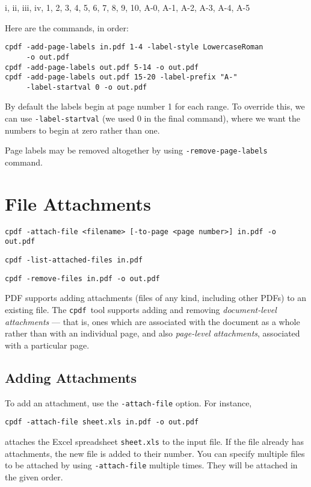 \documentclass{book}
\newcommand{\cpdf}{\texttt{cpdf}}
\begin{document}
\vspace{4mm}
i, ii, iii, iv, 1, 2, 3, 4, 5, 6, 7, 8, 9, 10, A-0, A-1, A-2, A-3, A-4, A-5
\vspace{4mm}

\noindent Here are the commands, in order:

{\small\begin{framed}
  \noindent\verb!cpdf -add-page-labels in.pdf 1-4 -label-style LowercaseRoman!\\
  \noindent\verb!     -o out.pdf!\\
  
  \noindent\verb!cpdf -add-page-labels out.pdf 5-14 -o out.pdf!\\

  \noindent\verb!cpdf -add-page-labels out.pdf 15-20 -label-prefix "A-"!\\
  \noindent\verb!     -label-startval 0 -o out.pdf!
\end{framed}}

\noindent By default the labels begin at page number 1 for each range. To override this, we can use \texttt{-label-startval} (we used $0$ in the final command), where we want the numbers to begin at zero rather than one.

Page labels may be removed altogether by using \texttt{-remove-page-labels} command.

\chapter{File Attachments}
\begin{framed}
  \small\noindent\verb!cpdf -attach-file <filename> [-to-page <page number>] in.pdf -o out.pdf!

  \vspace{1.5mm}
  \small\noindent\verb!cpdf -list-attached-files in.pdf!
 
  \vspace{1.5mm}
  \small\noindent\verb!cpdf -remove-files in.pdf -o out.pdf!
\end{framed}
  PDF supports adding attachments (files of any kind, including other PDFs) to
an existing file. The \cpdf\ tool supports adding and removing \textit{document-level
attachments} --- that is, ones which are associated with the document as a
whole rather than with an individual page, and also \textit{page-level attachments}, associated with a particular page.
  \section{Adding Attachments}
  To add an attachment, use the \texttt{-attach-file} option. For instance,
  \begin{framed}
  \small\verb!cpdf -attach-file sheet.xls in.pdf -o out.pdf!
  \end{framed}
  \noindent attaches the Excel spreadsheet \texttt{sheet.xls} to the input file. If the file already has attachments, the new file is added to their number. You can specify multiple files to be attached by using \verb!-attach-file! multiple times. They will be attached in the given order.
  
\end{document}
